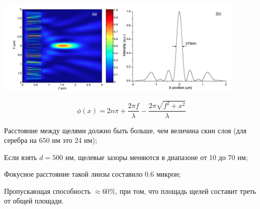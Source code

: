 \documentclass[9pt, compress, xcolor=table]{beamer}
\begin{document}
\begin{frame}{}

\begin{center}
\includegraphics[width=0.9\textwidth]{ns4}
\end{center}

\begin{equation*}
\boxed{\phi(x) = 2n\pi + \frac{2\pi f}{\lambda}-\frac{2\pi\sqrt{f^2+x^2}}{\lambda}}
\end{equation*}

Расстояние между щелями должно быть больше, чем величина скин слоя (для серебра на 650 нм это 24 нм);

Если взять $d=500$ нм, щелевые зазоры меняются в диапазоне от 10 до 70 нм;

Фокусное расстояние такой линзы составило 0.6 микрон;

Пропускающая способность $\approx 60 \%$, при том, что площадь щелей составит треть от общей площади. 

\end{frame}
\end{document}
